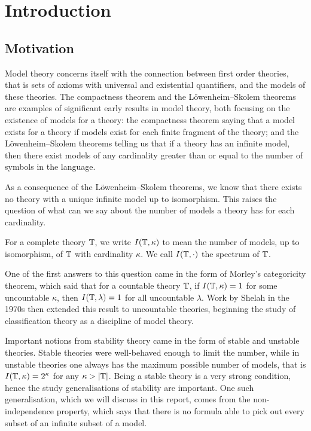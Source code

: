 \section{Introduction}%
\label{sec:introduction}

\subsection{Motivation}%
\label{sub:motivation}

Model theory concerns itself with the connection between first order theories, that is
sets of axioms with universal and existential quantifiers, and the models of these
theories. The compactness theorem and the Löwenheim–Skolem theorems are examples of
significant early results in model theory, both focusing on the existence of models for a
theory: the compactness theorem saying that a model exists for a theory if models
exist for each finite fragment of the theory; and the Löwenheim–Skolem theorems telling
us that if a theory has an infinite model, then there exist models of any cardinality
greater than or equal to the number of symbols in the language.

As a consequence of the Löwenheim–Skolem theorems, we know that there exists no theory
with a unique infinite model up to isomorphism. This raises the question of what can
we say about the number of models a theory has for each cardinality.

\begin{defn}
  For a complete theory $\mathbb{T}$, we write $I(\mathbb{T}, \kappa)$ to mean the number of
  models, up to isomorphism, of $\mathbb{T}$ with cardinality $\kappa$. We call
  $I(\mathbb{T}, \cdot)$ the spectrum of $\mathbb{T}$.
\end{defn}

One of the first answers to this question came in the form of Morley's categoricity
theorem, which said that for a countable theory $\mathbb{T}$, if $I(\mathbb{T},\kappa) = 1$ for
some uncountable $\kappa$, then $I(\mathbb{T},\lambda) = 1$ for all uncountable $\lambda$.
Work by Shelah in the 1970s then extended this result to uncountable theories, beginning
the study of classification theory as a discipline of model theory.

Important notions from stability theory came in the form of stable and unstable theories.
Stable theories were well-behaved enough to limit the number, while in unstable theories
one always has the maximum possible number of models, that is
$I(\mathbb{T},\kappa) = 2^\kappa$ for any $\kappa > |\mathbb{T}|$. Being a stable theory
is a very strong condition, hence the study generalisations of stability are important.
One such generalisation, which we will discuss in this report, comes from the
non-independence property, which says that there is no formula able to pick out every
subset of an infinite subset of a model.

